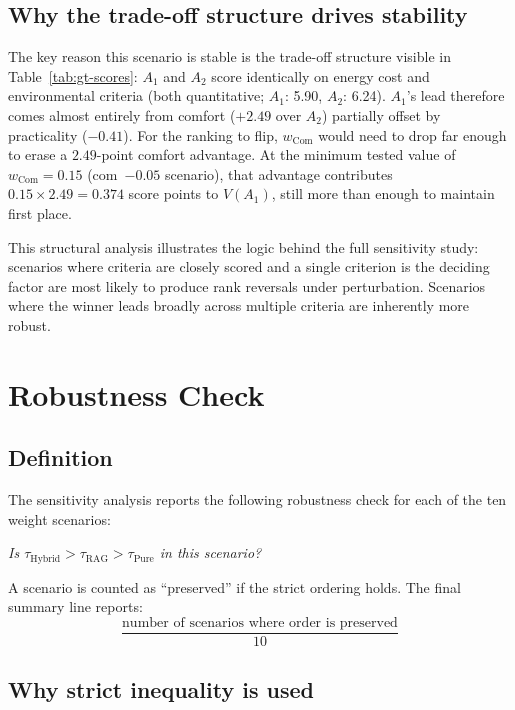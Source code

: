 \documentclass[11pt]{article}
\begin{document}
\subsection{Why the trade-off structure drives stability}

The key reason this scenario is stable is the trade-off structure visible in
Table~\ref{tab:gt-scores}: $A_1$ and $A_2$ score identically on energy cost
and environmental criteria (both quantitative; $A_1$: 5.90, $A_2$: 6.24).
$A_1$'s lead therefore comes almost entirely from comfort ($+2.49$ over $A_2$)
partially offset by practicality ($-0.41$).  For the ranking to flip,
$w_{\text{Com}}$ would need to drop far enough to erase a $2.49$-point comfort
advantage.  At the minimum tested value of $w_{\text{Com}} = 0.15$ (com~$-0.05$
scenario), that advantage contributes $0.15 \times 2.49 = 0.374$ score points
to $V(A_1)$, still more than enough to maintain first place.

This structural analysis illustrates the logic behind the full sensitivity
study: scenarios where criteria are closely scored and a single criterion is
the deciding factor are most likely to produce rank reversals under
perturbation.  Scenarios where the winner leads broadly across multiple
criteria are inherently more robust.

\section{Robustness Check}
\label{sec:robustness}

\subsection{Definition}

The sensitivity analysis reports the following robustness check for each of
the ten weight scenarios:
\begin{center}
  \textit{Is $\tau_{\text{Hybrid}} > \tau_{\text{RAG}} > \tau_{\text{Pure}}$
  in this scenario?}
\end{center}
A scenario is counted as ``preserved'' if the strict ordering holds.
The final summary line reports:
\[
  \frac{\text{number of scenarios where order is preserved}}{10}
\]

\subsection{Why strict inequality is used}
\end{document}
